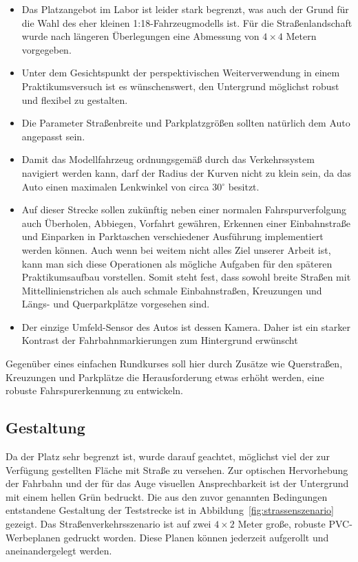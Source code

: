 \begin{itemize}
	\item Das Platzangebot im Labor ist leider stark begrenzt, was auch der Grund für die Wahl des eher kleinen 1:18-Fahrzeugmodells ist. Für die Straßenlandschaft wurde nach längeren Überlegungen eine Abmessung von \(4 \times 4\) Metern vorgegeben.
	
	\item Unter dem Gesichtspunkt der perspektivischen Weiterverwendung in einem Praktikumsversuch ist es wünschenswert, den Untergrund möglichst robust und flexibel zu gestalten.
	
	\item Die Parameter Straßenbreite und Parkplatzgrößen sollten natürlich dem Auto angepasst sein. 
	
	\item Damit das Modellfahrzeug ordnungsgemäß durch das Verkehrssystem navigiert werden kann, darf der Radius der Kurven nicht zu klein sein, da das Auto einen maximalen Lenkwinkel von circa 30\(^\circ\) besitzt. 
	
	\item Auf dieser Strecke sollen zukünftig neben einer normalen Fahrspurverfolgung auch Überholen, Abbiegen, Vorfahrt gewähren, Erkennen einer Einbahnstraße und Einparken in Parktaschen verschiedener Ausführung implementiert werden können. Auch wenn bei weitem nicht alles Ziel unserer Arbeit ist, kann man sich diese Operationen als mögliche Aufgaben für den späteren Praktikumsaufbau vorstellen. Somit steht fest, dass sowohl breite Straßen mit Mittellinienstrichen als auch schmale Einbahnstraßen, Kreuzungen und Längs- und Querparkplätze vorgesehen sind.
	
	\item Der einzige Umfeld-Sensor des Autos ist dessen Kamera. Daher ist ein starker Kontrast der Fahrbahnmarkierungen zum Hintergrund erwünscht
\end{itemize}

Gegenüber eines einfachen Rundkurses soll hier durch Zusätze wie Querstraßen, Kreuzungen und Parkplätze die Herausforderung etwas erhöht werden, eine robuste Fahrspurerkennung zu entwickeln. 

\subsection{Gestaltung}

Da der Platz sehr begrenzt ist, wurde darauf geachtet, möglichst viel der zur Verfügung gestellten Fläche mit Straße zu versehen. Zur optischen Hervorhebung der Fahrbahn und der für das Auge visuellen Ansprechbarkeit ist der Untergrund mit einem hellen Grün bedruckt. Die aus den zuvor genannten Bedingungen entstandene Gestaltung der Teststrecke ist in Abbildung~\ref{fig:strassenszenario} gezeigt. Das Straßenverkehrsszenario ist auf zwei \(4 \times 2\) Meter große, robuste PVC-Werbeplanen gedruckt worden. Diese Planen können jederzeit aufgerollt und aneinandergelegt werden.

